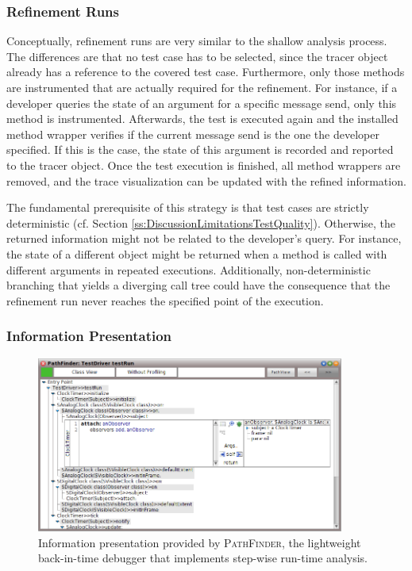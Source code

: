 \subsubsection{Refinement Runs}
Conceptually, refinement runs are very similar to the shallow analysis process.
The differences are that no test case has to be selected, since the tracer object already has a reference to the covered test case.
Furthermore, only those methods are instrumented that are actually required for the refinement.
For instance, if a developer queries the state of an argument for a specific message send, only this method is instrumented.
Afterwards, the test is executed again and the installed method wrapper verifies if the current message send is the one the developer specified.
If this is the case, the state of this argument is recorded and reported to the tracer object.
Once the test execution is finished, all method wrappers are removed, and the trace visualization can be updated with the refined information.

The fundamental prerequisite of this strategy is that test cases are strictly deterministic (cf. Section \ref{ss:DiscussionLimitationsTestQuality}).
Otherwise, the returned information might not be related to the developer's query.
For instance, the state of a different object might be returned when a method is called with different arguments in repeated executions.
Additionally, non-deterministic branching that yields a diverging call tree could have the consequence that the refinement run never reaches the specified point of the execution.

\subsubsection{Information Presentation}

\begin{figure}[tb]
	\centering
	\includegraphics[width=0.9\textwidth]{../images/02-TracingPathFinder}
	\caption[Information Presentation Provided by \textsc{PathFinder}]{Information presentation provided by \textsc{PathFinder}, the lightweight back-in-time debugger that implements step-wise run-time analysis.}
	\label{fig:BackgroundPathFinder}
\end{figure}

